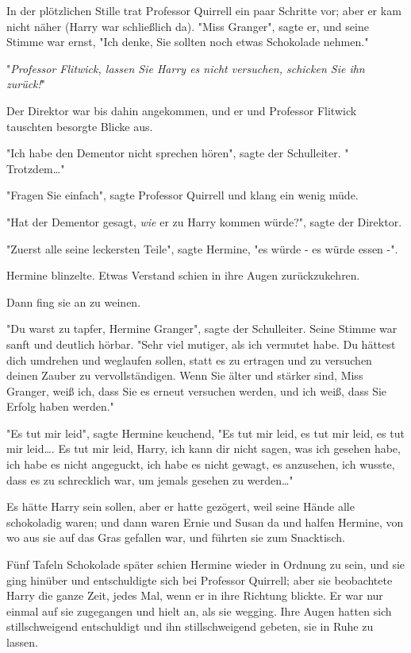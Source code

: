{In der plötzlichen Stille trat Professor Quirrell ein paar Schritte vor; aber er kam nicht näher (Harry war schließlich da). "Miss Granger", sagte er, und seine Stimme war ernst, "Ich denke, Sie sollten noch etwas Schokolade nehmen."

"\emph{Professor Flitwick, lassen Sie Harry es nicht versuchen, schicken Sie ihn zurück!}"

Der Direktor war bis dahin angekommen, und er und Professor Flitwick tauschten besorgte Blicke aus.

"Ich habe den Dementor nicht sprechen hören", sagte der Schulleiter. " Trotzdem…"

"Fragen Sie einfach", sagte Professor Quirrell und klang ein wenig müde.

"Hat der Dementor gesagt, \emph{wie} er zu Harry kommen würde?", sagte der Direktor.

"Zuerst alle seine leckersten Teile", sagte Hermine, "es würde - es würde essen -".

Hermine blinzelte. Etwas Verstand schien in ihre Augen zurückzukehren.

Dann fing sie an zu weinen.

"Du warst zu tapfer, Hermine Granger", sagte der Schulleiter. Seine Stimme war sanft und deutlich hörbar. "Sehr viel mutiger, als ich vermutet habe. Du hättest dich umdrehen und weglaufen sollen, statt es zu ertragen und zu versuchen deinen Zauber zu vervollständigen. Wenn Sie älter und stärker sind, Miss Granger, weiß ich, dass Sie es erneut versuchen werden, und ich weiß, dass Sie Erfolg haben werden."

"Es tut mir leid", sagte Hermine keuchend, "Es tut mir leid, es tut mir leid, es tut mir leid…. Es tut mir leid, Harry, ich kann dir nicht sagen, was ich gesehen habe, ich habe es nicht angeguckt, ich habe es nicht gewagt, es anzusehen, ich wusste, dass es zu schrecklich war, um jemals gesehen zu werden…"

Es hätte Harry sein sollen, aber er hatte gezögert, weil seine Hände alle schokoladig waren; und dann waren Ernie und Susan da und halfen Hermine, von wo aus sie auf das Gras gefallen war, und führten sie zum Snacktisch.

Fünf Tafeln Schokolade später schien Hermine wieder in Ordnung zu sein, und sie ging hinüber und entschuldigte sich bei Professor Quirrell; aber sie beobachtete Harry die ganze Zeit, jedes Mal, wenn er in ihre Richtung blickte. Er war nur einmal auf sie zugegangen und hielt an, als sie wegging. Ihre Augen hatten sich stillschweigend entschuldigt und ihn stillschweigend gebeten, sie in Ruhe zu lassen.

}
